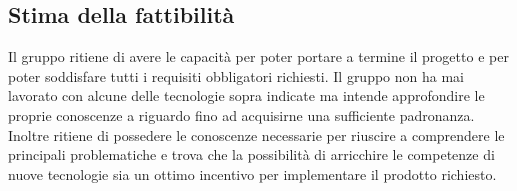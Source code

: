 	\subsection{Stima della fattibilità}
		Il gruppo \groupname{} ritiene di avere le capacità per poter portare a termine il progetto e per poter soddisfare tutti i requisiti obbligatori richiesti. Il gruppo non ha mai lavorato con alcune delle tecnologie sopra indicate ma intende approfondire le proprie conoscenze a riguardo fino ad acquisirne una sufficiente padronanza. Inoltre ritiene di possedere le conoscenze necessarie per riuscire a comprendere le principali problematiche e trova che la possibilità di arricchire le competenze di nuove tecnologie sia un ottimo incentivo per implementare il prodotto richiesto.
